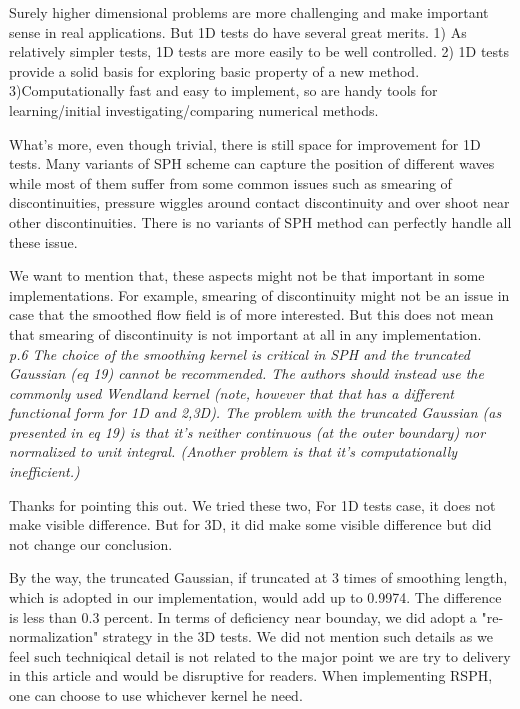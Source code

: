 \documentclass[10pt,a4paper]{article}
\begin{document}
Surely higher dimensional problems are more challenging and make important sense in real applications. 
But 1D tests do have several great merits. 1) As relatively simpler tests, 1D tests are more easily to be well controlled. 2) 1D tests provide a solid basis for exploring basic property of a new method. 3)Computationally fast and easy to implement, so are handy tools for learning/initial investigating/comparing numerical methods. 

What's more, even though trivial, there is still space for improvement for 1D tests. Many variants of SPH scheme can capture the position of different waves while most of them suffer from some common issues such as smearing of discontinuities, pressure wiggles around contact discontinuity and over shoot near other discontinuities. There is no variants of SPH method can perfectly handle all these issue. 

We want to mention that, these aspects might not be that important in some implementations. For example, smearing of discontinuity might not be an issue in case that the smoothed flow field is of more interested. But this does not mean that smearing of discontinuity is not important at all in any implementation.
\\[3pt]

\textit{p.6 The choice of the smoothing kernel is critical in SPH and the truncated Gaussian (eq 19) cannot be recommended. The authors should instead use the commonly used Wendland kernel (note, however that that has a different functional form for 1D and 2,3D). The problem with the truncated Gaussian (as presented in eq 19) is that it's neither continuous (at the outer boundary) nor normalized to unit integral. (Another problem is that it's computationally inefficient.)}

Thanks for pointing this out. We tried these two, For 1D tests case, it does not make visible difference. But for 3D, it did make some visible difference but did not change our conclusion.

By the way, the truncated Gaussian, if truncated at 3 times of smoothing length, which is adopted in our implementation, would add up to 0.9974. The difference is less than 0.3 percent. 
In terms of deficiency near bounday, we did adopt a "re-normalization" strategy in the 3D tests. We did not mention such details as we feel such techniqical detail is not related to the major point we are try to delivery in this article and would be disruptive for readers. 
When implementing RSPH, one can choose to use whichever kernel he need.
\\[3pt]
\end{document}
